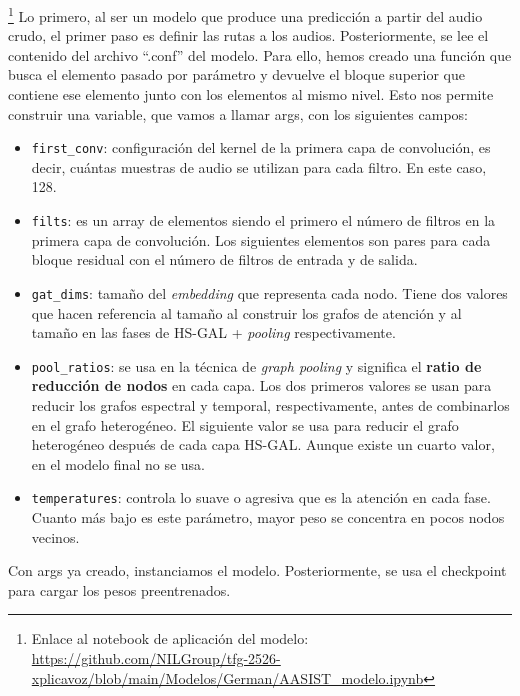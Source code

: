 \footnote{Enlace al notebook de aplicación del modelo: \url{https://github.com/NILGroup/tfg-2526-xplicavoz/blob/main/Modelos/German/AASIST_modelo.ipynb}}
Lo primero, al ser un modelo que produce una predicción a partir del audio crudo, el primer paso es definir las rutas a los audios.
Posteriormente, se lee el contenido del archivo ``.conf'' del modelo. Para ello, hemos creado una función que busca el elemento pasado por parámetro y devuelve el bloque superior que contiene ese elemento junto con los elementos al mismo nivel. Esto nos permite construir una variable, que vamos a llamar args, con los siguientes campos:
\begin{itemize}
    \item \texttt{first\_conv}: configuración del kernel de la primera capa de convolución, es decir, cuántas muestras de audio se utilizan para cada filtro. En este caso, 128.
    \item \texttt{filts}: es un array de elementos siendo el primero el número de filtros en la primera capa de convolución. Los siguientes elementos son pares para cada bloque residual con el número de filtros de entrada y de salida.
    \item \texttt{gat\_dims}: tamaño del \textit{embedding} que representa cada nodo. Tiene dos valores que hacen referencia al tamaño al construir los grafos de atención y al tamaño en las fases de HS-GAL + \textit{pooling} respectivamente.
    \item \texttt{pool\_ratios}: se usa en la técnica de \textit{graph pooling} y significa el \textbf{ratio de reducción de nodos} en cada capa. Los dos primeros valores se usan para reducir los grafos espectral y temporal, respectivamente, antes de combinarlos en el grafo heterogéneo. El siguiente valor se usa para reducir el grafo heterogéneo después de cada capa HS-GAL. Aunque existe un cuarto valor, en el modelo final no se usa.
    \item \texttt{temperatures}: controla lo suave o agresiva que es la atención en cada fase. Cuanto más bajo es este parámetro, mayor peso se concentra en pocos nodos vecinos.
\end{itemize}
Con args ya creado, instanciamos el modelo. Posteriormente, se usa el checkpoint para cargar los pesos preentrenados.

